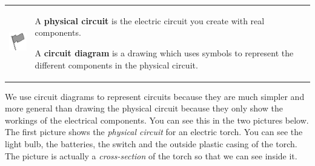           
\par
            \label{m38771*fhsst!!!underscore!!!id258}\begin{definition}
	  \begin{tabular*}{15 cm}{m{15 mm}m{}}
	\hspace*{-50pt}  \includegraphics[width=0.5in]{col11305.imgs/psflag2.png}   & \Definition{   \label{id2478537}\textbf{ Representing circuits }} { \label{m38771*meaningfhsst!!!underscore!!!id258}
          \label{m38771*id63196}A \textbf{physical circuit} is the electric circuit you create with real components.\par 
          \label{m38771*id63206}A \textbf{circuit diagram} is a drawing which uses symbols to represent the different components in the physical circuit.
 \par 
           } 
      \end{tabular*}
      \end{definition}

          \label{m38771*id63223}We use circuit diagrams to represent circuits because they are much simpler and more general than drawing the physical circuit because they only show the workings of the electrical components. You can see this in the two pictures below. The first picture shows the \textsl{physical circuit} for an electric torch. You can see the light bulb, the batteries, the switch and the outside plastic casing of the torch. The picture is actually a \textsl{cross-section} of the torch so that we can see inside it.\par 
          
    \setcounter{subfigure}{0}


